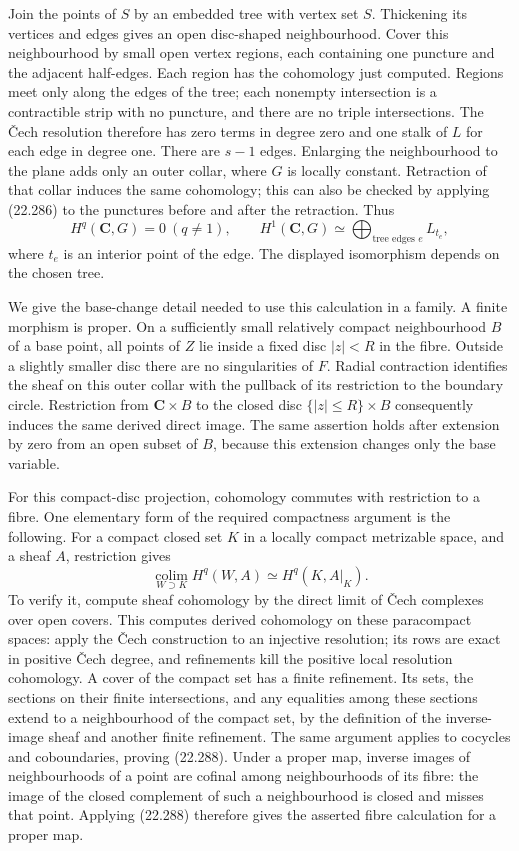 \documentclass[
  11pt,
  a4paper,
]{article}
\newcounter{none} %
\begin{document}
Join the points of \(S\) by an embedded tree with vertex set \(S\).
Thickening its vertices and edges gives an open disc-shaped
neighbourhood. Cover this neighbourhood by small open vertex regions,
each containing one puncture and the adjacent half-edges. Each region
has the cohomology just computed. Regions meet only along the edges of
the tree; each nonempty intersection is a contractible strip with no
puncture, and there are no triple intersections. The Čech resolution
therefore has zero terms in degree zero and one stalk of \(L\) for each
edge in degree one. There are \(s-1\) edges. Enlarging the neighbourhood
to the plane adds only an outer collar, where \(G\) is locally constant.
Retraction of that collar induces the same cohomology; this can also be
checked by applying (22.286) to the punctures before and after the
retraction. Thus \[
 H^q(\mathbf C,G)=0\ (q\ne1),\qquad
 H^1(\mathbf C,G)\simeq\bigoplus_{\text{tree edges }e}L_{t_e},
 \tag{22.287}
\] where \(t_e\) is an interior point of the edge. The displayed
isomorphism depends on the chosen tree.

We give the base-change detail needed to use this calculation in a
family. A finite morphism is proper. On a sufficiently small relatively
compact neighbourhood \(B\) of a base point, all points of \(Z\) lie
inside a fixed disc \(|z|<R\) in the fibre. Outside a slightly smaller
disc there are no singularities of \(F\). Radial contraction identifies
the sheaf on this outer collar with the pullback of its restriction to
the boundary circle. Restriction from \(\mathbf C\times B\) to the
closed disc \(\{|z|\le R\}\times B\) consequently induces the same
derived direct image. The same assertion holds after extension by zero
from an open subset of \(B\), because this extension changes only the
base variable.

For this compact-disc projection, cohomology commutes with restriction
to a fibre. One elementary form of the required compactness argument is
the following. For a compact closed set \(K\) in a locally compact
metrizable space, and a sheaf \(A\), restriction gives \[
 \underset{W\supset K}{\operatorname{colim}}H^q(W,A)
       \simeq H^q(K,A|_K).
 \tag{22.288}
\] To verify it, compute sheaf cohomology by the direct limit of Čech
complexes over open covers. This computes derived cohomology on these
paracompact spaces: apply the Čech construction to an injective
resolution; its rows are exact in positive Čech degree, and refinements
kill the positive local resolution cohomology. A cover of the compact
set has a finite refinement. Its sets, the sections on their finite
intersections, and any equalities among these sections extend to a
neighbourhood of the compact set, by the definition of the inverse-image
sheaf and another finite refinement. The same argument applies to
cocycles and coboundaries, proving (22.288). Under a proper map, inverse
images of neighbourhoods of a point are cofinal among neighbourhoods of
its fibre: the image of the closed complement of such a neighbourhood is
closed and misses that point. Applying (22.288) therefore gives the
asserted fibre calculation for a proper map.
\end{document}
